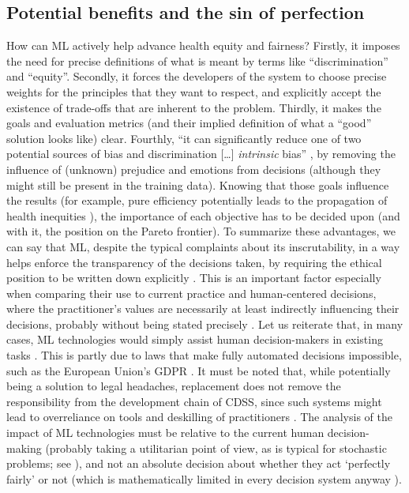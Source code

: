 \subsection{Potential benefits and the sin of perfection}
    How can ML actively help advance health equity and fairness?
    Firstly, it imposes the need for precise definitions of what is meant by terms like ``discrimination'' and ``equity''.
    Secondly, it forces the developers of the system to choose precise weights for the principles that they want to respect, and explicitly accept the existence of trade-offs that are inherent to the problem.
    Thirdly, it makes the goals and evaluation metrics (and their implied definition of what a ``good'' solution looks like) clear.
    Fourthly, ``it can significantly reduce one of two potential sources of bias and discrimination [\dots] \emph{intrinsic} bias'' \cite[p.~672]{Zerilli2019}, by removing the influence of (unknown) prejudice and emotions from decisions (although they might still be present in the training data).
    Knowing that those goals influence the results \cite{Dijkstra2020} (for example, pure efficiency potentially leads to the propagation of health inequities \cite{Rajkomar2018}), the importance of each objective has to be decided upon (and with it, the position on the Pareto frontier).
    To summarize these advantages, we can say that ML, despite the typical complaints about its inscrutability, in a way helps enforce the transparency of the decisions taken, by requiring the ethical position to be written down explicitly \cite{Williamson2021}.
    This is an important factor especially when comparing their use to current practice and human-centered decisions, where the practitioner's values are necessarily at least indirectly influencing their decisions, probably without being stated precisely \cite{Zerilli2019}.
    Let us reiterate that, in many cases, ML technologies would simply assist human decision-makers in existing tasks \cite{Morley2020}.
    This is partly due to laws that make fully automated decisions impossible, such as the European Union's GDPR \cite{Zerilli2019}.
    It must be noted that, while potentially being a solution to legal headaches, replacement does not remove the responsibility from the development chain of CDSS, since such systems might lead to overreliance on tools and deskilling of practitioners \cite{Morley2020}.
    The analysis of the impact of ML technologies must be relative to the current human decision-making (probably taking a utilitarian point of view, as is typical for stochastic problems; see \cite{Hardin1989}), and not an absolute decision about whether they act `perfectly fairly' or not (which is mathematically limited in every decision system anyway \cite{Zerilli2019}).
